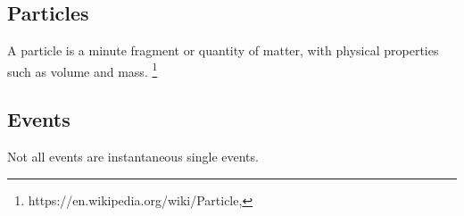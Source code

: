 \subsection{Particles}
\label{sec:particles}

A particle is a minute fragment or quantity of matter, with physical
properties such as volume and mass.
\footnote{https://en.wikipedia.org/wiki/Particle, \date{18 Sep. 2016}}




\subsection{Events}
\label{sec:events}
%
Not all events are instantaneous single events.








